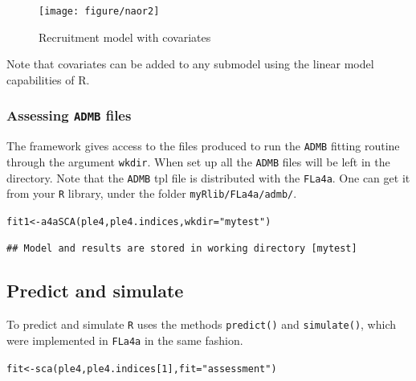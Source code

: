 \documentclass[a4paper,english,10pt]{article}\usepackage[]{graphicx}\usepackage[]{color}
\makeatletter
\newcommand{\hlnum}[1]{\textcolor[rgb]{0.2,0.2,0.2}{#1}}%
\newcommand{\hlstr}[1]{\textcolor[rgb]{0.2,0.2,0.2}{#1}}%
\newcommand{\hlstd}[1]{\textcolor[rgb]{0,0,0}{#1}}%
\newcommand{\hlkwb}[1]{\textcolor[rgb]{0.361,0.506,0.596}{#1}}%
\newcommand{\hlkwc}[1]{\textcolor[rgb]{0.361,0.506,0.596}{#1}}%
\newcommand{\hlkwd}[1]{\textcolor[rgb]{0.361,0.506,0.596}{#1}}%
\newenvironment{kframe}{%
 \def\at@end@of@kframe{}%
 \ifinner\ifhmode%
  \def\at@end@of@kframe{\end{minipage}}%
  \begin{minipage}{\columnwidth}%
 \fi\fi%
 \def\FrameCommand##1{\hskip\@totalleftmargin \hskip-\fboxsep
 \colorbox{shadecolor}{##1}\hskip-\fboxsep
     \hskip-\linewidth \hskip-\@totalleftmargin \hskip\columnwidth}%
 \MakeFramed {\advance\hsize-\width
   \@totalleftmargin\z@ \linewidth\hsize
   \@setminipage}}%
 {\par\unskip\endMakeFramed%
 \at@end@of@kframe}
\newenvironment{knitrout}{}{} %
\newcommand{\code}[1]{{\texttt{#1}}}
\newcommand{\pkg}[1]{{\texttt{#1}}}
\makeatother
\begin{document}
\begin{knitrout}
\color{fgcolor}\begin{figure}[H]


{\centering \texttt{[image: figure/naor2]} 

}

\caption[Recruitment model with covariates]{Recruitment model with covariates\label{fig:naor2}}
\end{figure}


\end{knitrout}

Note that covariates can be added to any submodel using the linear model capabilities of R.

\subsubsection{Assessing \pkg{ADMB} files}

The framework gives access to the files produced to run the \pkg{ADMB} fitting routine through the argument \code{wkdir}. When set up all the \pkg{ADMB} files will be left in the directory. Note that the \pkg{ADMB} tpl file is distributed with the \pkg{FLa4a}. One can get it from your \pkg{R} library, under the folder \code{myRlib/FLa4a/admb/}.

\begin{knitrout}
\color{fgcolor}\begin{kframe}
\begin{alltt}
\hlstd{fit1} \hlkwb{<-} \hlkwd{a4aSCA}\hlstd{(ple4, ple4.indices,} \hlkwc{wkdir}\hlstd{=}\hlstr{"mytest"}\hlstd{)}
\end{alltt}
\begin{verbatim}
## Model and results are stored in working directory [mytest]
\end{verbatim}
\end{kframe}
\end{knitrout}

\subsection{Predict and simulate}

To predict and simulate \pkg{R} uses the methods \code{predict()} and \code{simulate()}, which were implemented in \pkg{FLa4a} in the same fashion.

\begin{knitrout}
\color{fgcolor}\begin{kframe}
\begin{alltt}
\hlstd{fit} \hlkwb{<-} \hlkwd{sca}\hlstd{(ple4, ple4.indices[}\hlnum{1}\hlstd{],} \hlkwc{fit}\hlstd{=}\hlstr{"assessment"}\hlstd{)}
\end{alltt}
\end{kframe}
\end{knitrout}
\end{document}
